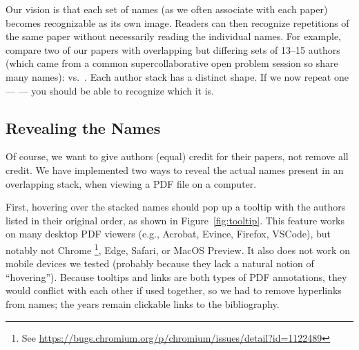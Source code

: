 \documentclass[natbib,authoryear]{sigtbd17-style}
\begin{document}
Our vision is that each set of names (as we often associate with each paper)
becomes recognizable as its own image.  Readers can then recognize repetitions
of the same paper without necessarily reading the individual names.
For example, compare two of our papers with overlapping but differing sets
of 13--15 authors (which came from a common supercollaborative open problem
session so share many names):
\citet{ArithmeticGames_ISAAC2020} vs.\ \citet{LessThanEdgeMatching_JIP}.
Each author stack has a distinct shape.
If we now repeat one --- \citet{ArithmeticGames_ISAAC2020} ---
you should be able to recognize which it is.

\subsection{Revealing the Names}

Of course, we want to give authors (equal) credit for their papers,
not remove all credit.
We have implemented two ways to reveal the actual names present
in an overlapping stack, when viewing a PDF file on a computer.

First, hovering over the stacked names should pop up a tooltip with the
authors listed in their original order, as shown in
Figure~\ref{fig:tooltip}.
This feature works on many desktop PDF viewers (e.g., Acrobat, Evince, Firefox,
VSCode), but notably not Chrome%
\footnote{See \url{https://bugs.chromium.org/p/chromium/issues/detail?id=1122489}},
Edge, Safari, or MacOS Preview.
It also does not work on mobile devices we tested
(probably because they lack a natural notion of ``hovering'').
Because tooltips and links are both types of PDF annotations, they would
conflict with each other if used together, so we had to remove hyperlinks
from names; the years remain clickable links to the bibliography.
\end{document}
